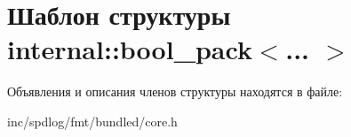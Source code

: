 \hypertarget{structinternal_1_1bool__pack}{}\section{Шаблон структуры internal\+:\+:bool\+\_\+pack$<$... $>$}
\label{structinternal_1_1bool__pack}


Объявления и описания членов структуры находятся в файле\+:\begin{DoxyCompactItemize}
\item 
inc/spdlog/fmt/bundled/core.\+h\end{DoxyCompactItemize}
